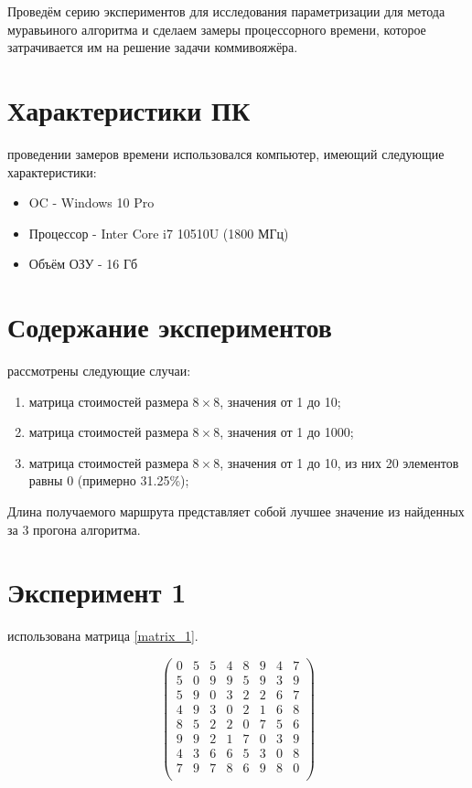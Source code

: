 Проведём серию экспериментов для исследования параметризации для метода муравьиного алгоритма и сделаем замеры процессорного времени, которое затрачивается им на решение задачи коммивояжёра.

\section{Характеристики ПК}
 проведении замеров времени использовался компьютер, имеющий следующие характеристики:
\begin{itemize}
	\item OC - Windows 10 Pro
	\item Процессор - Inter Core i7 10510U (1800 МГц)
	\item Объём ОЗУ - 16 Гб
\end{itemize}

\section{Содержание экспериментов}
 рассмотрены следующие случаи:
\begin{enumerate}
	\item матрица стоимостей размера $8 \times 8$, значения от 1 до 10;
	\item матрица стоимостей размера $8 \times 8$, значения от 1 до 1000;
	\item матрица стоимостей размера $8 \times 8$, значения от 1 до 10, из них 20 элементов  равны 0 (примерно 31.25\%);
\end{enumerate}

Длина получаемого маршрута представляет собой лучшее значение из найденных за 3 прогона алгоритма.

\section{Эксперимент 1}
 использована матрица \ref{matrix_1}.

\begin{scriptsize} 
	\begin{equation}\label{matrix_1}
		\left(
		\begin{array}{cccccccc}
			 0& 5& 5& 4& 8& 9& 4& 7\\
			5&  0& 9& 9& 5& 9& 3& 9\\
			5& 9&  0& 3& 2& 2& 6& 7\\
			4& 9& 3&  0& 2& 1& 6& 8\\
			8& 5& 2& 2&  0& 7& 5& 6\\
			9& 9& 2& 1& 7&  0& 3& 9\\
			4& 3& 6& 6& 5& 3&  0& 8\\
			7& 9& 7& 8& 6& 9& 8&  0\\
		\end{array}\right)
\end{equation} \end{scriptsize}

